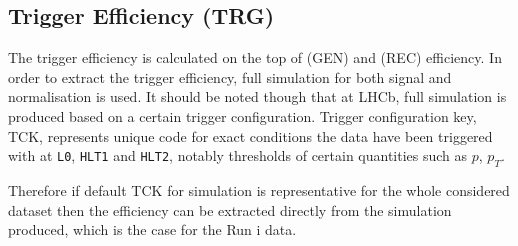 %
%		


\subsection{Trigger Efficiency (TRG)}
\label{trigef}
 The trigger efficiency is calculated on the top of (GEN) and (REC) efficiency. In order to extract the trigger efficiency, full simulation for both signal and normalisation is used. It should be noted though that at \gls{LHCb}, full simulation is produced based on a certain trigger configuration. Trigger configuration key, TCK, represents unique code for exact conditions the data have been triggered with at \texttt{L0}, \texttt{HLT1} and \texttt{HLT2}, notably thresholds of certain quantities such as $p$, $p_{T}$. 
 
Therefore if default TCK for simulation is representative for the whole considered dataset then the efficiency can be extracted directly from the simulation produced, which is the case for the Run \Rn{1} data.

